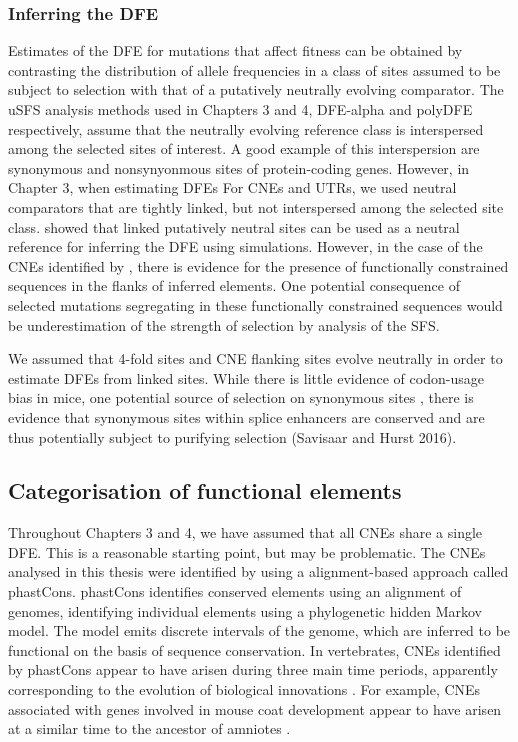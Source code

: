 \subsubsection{Inferring the DFE}
	
	Estimates of the DFE for mutations that affect fitness can be obtained by contrasting the distribution of allele frequencies in a class of sites assumed to be subject to selection with that of a putatively neutrally evolving comparator. The uSFS analysis methods used in Chapters 3 and 4, DFE-alpha and polyDFE respectively, assume that the neutrally evolving reference class is interspersed among the selected sites of interest. A good example of this interspersion are synonymous and nonsynyonmous sites of protein-coding genes. However, in Chapter 3, when estimating DFEs For CNEs and UTRs, we  used neutral comparators that are tightly linked, but not interspersed among the selected site class. \cite{RN178} showed that linked putatively neutral sites can be used as a neutral reference for inferring the DFE using simulations. However, in the case of the CNEs identified by \cite{RN122}, there is evidence for the presence of functionally constrained sequences in the flanks of inferred elements. One potential consequence of selected mutations segregating in these functionally constrained sequences would be underestimation of the strength of selection by analysis of the SFS.
	
	We assumed that 4-fold sites and CNE flanking sites evolve neutrally in order to estimate DFEs from linked sites. While there is little evidence of codon-usage bias in mice, one potential source of selection on synonymous sites \citep{RN195}, there is evidence that synonymous sites within splice enhancers are conserved and are thus potentially subject to purifying selection (Savisaar and Hurst 2016). 
	
\subsection{Categorisation of functional elements}	
	
	Throughout Chapters 3 and 4, we have assumed that all CNEs share a single DFE. This is a reasonable starting point, but may be problematic. The CNEs analysed in this thesis were identified by \cite{RN122} using a alignment-based approach called phastCons. phastCons identifies conserved elements using an alignment of genomes, identifying individual elements using a phylogenetic hidden Markov model. The model emits discrete intervals of the genome, which are inferred to be functional on the basis of sequence conservation. In vertebrates, CNEs identified by phastCons appear to have arisen during three main time periods, apparently corresponding to the evolution of biological innovations \citep{RN353}. For example, CNEs associated with genes involved in mouse coat development appear to have arisen at a similar time to the ancestor of amniotes \citep{RN353}.
	
